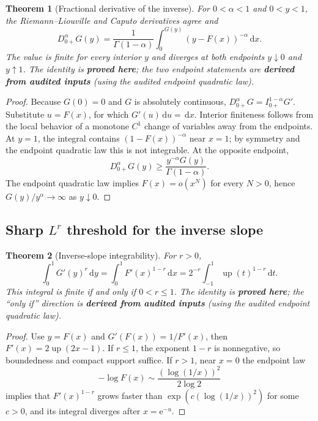\documentclass[11pt]{article}
\newcommand{\statusproved}{\textcolor{statusgreen}{\textbf{proved here}}}
\newcommand{\statusderived}{\textcolor{statusblue}{\textbf{derived from audited inputs}}}
\newtheorem{theorem}{Theorem}[section]
\theoremstyle{definition}
\theoremstyle{remark}
\newcommand{\dd}{\,\mathrm d}
\newcommand{\e}{\mathrm e}
\newcommand{\Up}{\operatorname{up}}
\begin{document}
\begin{theorem}[Fractional derivative of the inverse]
\label{thm:inverse-fractional-derivative}
For $0<\alpha<1$ and $0<y<1$, the Riemann--Liouville and Caputo derivatives agree and
\begin{equation}
 D_{0+}^{\alpha}G(y)
 =\frac1{\Gamma(1-\alpha)}
 \int_0^{G(y)}(y-F(x))^{-\alpha}\dd x.
 \label{eq:inverse-fractional-derivative}
\end{equation}
The value is finite for every interior $y$ and diverges at both endpoints
$y\downarrow0$ and $y\uparrow1$.  The identity is \statusproved; the two endpoint
statements are \statusderived{} (using the audited endpoint quadratic law).
\end{theorem}

\begin{proof}
Because $G(0)=0$ and $G$ is absolutely continuous,
$D_{0+}^{\alpha}G=I_{0+}^{1-\alpha}G'$.  Substitute $u=F(x)$, for which
$G'(u)\dd u=\dd x$.  Interior finiteness follows from the local behavior of a monotone
$C^1$ change of variables away from the endpoints.  At $y=1$, the integral contains
$(1-F(x))^{-\alpha}$ near $x=1$; by symmetry and the endpoint quadratic law this is not
integrable.  At the opposite endpoint,
\[
 D_{0+}^{\alpha}G(y)
 \ge \frac{y^{-\alpha}G(y)}{\Gamma(1-\alpha)}.
\]
The endpoint quadratic law implies $F(x)=o(x^N)$ for every $N>0$, hence
$G(y)/y^\alpha\to\infty$ as $y\downarrow0$.
\end{proof}

\subsection{Sharp $L^r$ threshold for the inverse slope}

\begin{theorem}[Inverse-slope integrability]
\label{thm:inverse-slope-Lr}
For $r>0$,
\begin{equation}
 \int_0^1G'(y)^r\dd y
 =\int_0^1F'(x)^{1-r}\dd x
 =2^{-r}\int_{-1}^{1}\Up(t)^{1-r}\dd t.
 \label{eq:inverse-slope-Lr}
\end{equation}
This integral is finite if and only if $0<r\le1$.  The identity is \statusproved; the
``only if'' direction is \statusderived{} (using the audited endpoint quadratic law).
\end{theorem}

\begin{proof}
Use $y=F(x)$ and $G'(F(x))=1/F'(x)$, then
$F'(x)=2\Up(2x-1)$.  If $r\le1$, the exponent $1-r$ is nonnegative, so boundedness and compact
support suffice.  If $r>1$, near $x=0$ the endpoint law
\[
 -\log F(x)\sim\frac{(\log(1/x))^2}{2\log2}
\]
implies that $F'(x)^{1-r}$ grows faster than
$\exp(c(\log(1/x))^2)$ for some $c>0$, and its integral diverges after $x=\e^{-u}$.
\end{proof}
\end{document}
